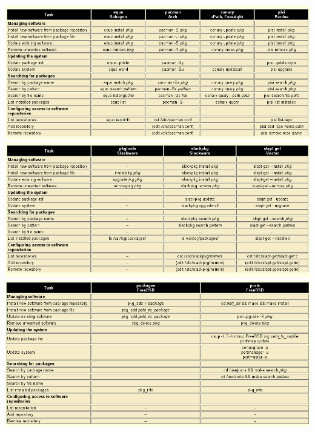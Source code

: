 \begin{center}
\includegraphics[scale=0.5]{src/package_managers_5.png}
\includegraphics[scale=0.5]{src/package_managers_6.png}
\includegraphics[scale=0.5]{src/package_managers_7.png}
\end{center}
